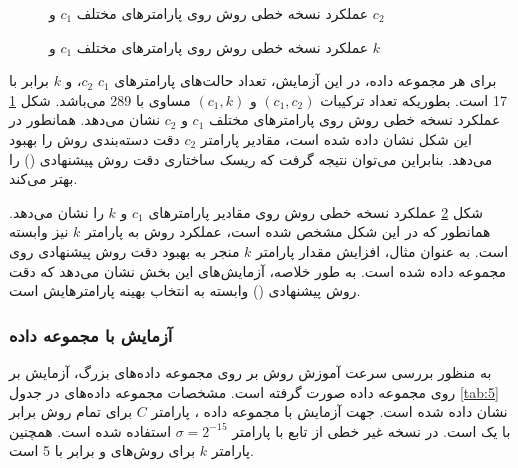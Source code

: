 \begin{figure}[!t]
	\centering
	\caption{عملکرد نسخه خطی روش  روی پارامترهای مختلف $c_{1}$ و $c_{2}$}
	\label{fig:RKNN-TSVM-Aust-Hep-C_1_2}
\end{figure}
\begin{figure}[!t]
	\centering
	\caption{عملکرد نسخه خطی روش  روی پارامترهای مختلف $c_{1}$ و $k$}
	\label{fig:RKNN-TSVM-Aust-Hep-C_1_k}
\end{figure}

برای هر مجموعه داده، در این آزمایش، تعداد حالت‌های پارامترهای $c_{1}$ $c_{2}$، و $k$ برابر با 17 است. بطوریکه تعداد ترکیبات $(c_{1},c_{2})$ و $(c_{1}, k)$ مساوی با 289 می‌باشد. شکل \ref{fig:RKNN-TSVM-Aust-Hep-C_1_2} عملکرد نسخه خطی روش روی پارامترهای مختلف $c_{1}$ و $c_{2}$ نشان می‌دهد. همانطور در این شکل نشان داده شده است، مقادیر پارامتر $c_{2}$ دقت دسته‌بندی روش  را بهبود می‌دهد. بنابراین می‌توان نتیجه گرفت که ریسک ساختاری دقت روش ‍پیشنهادی () را بهتر می‌کند.

شکل \ref{fig:RKNN-TSVM-Aust-Hep-C_1_k} عملکرد نسخه خطی روش  روی مقادیر پارامترهای $c_{1}$ و $k$ را نشان می‌دهد. همانطور که در این شکل مشخص شده است، عملکرد روش  به پارامتر $k$ نیز وابسته است. به عنوان مثال، افزایش مقدار پارامتر $k$ منجر به بهبود دقت روش پیشنهادی روی مجموعه داده  شده است. به طور خلاصه، آزمایش‌های این بخش نشان می‌دهد که دقت روش پیشنهادی () وابسته به انتخاب بهینه پارامترهایش است.

\subsubsection{آزمایش با مجموعه داده }\label{sec:5:3:3:5}
به منظور بررسی سرعت آموزش روش  بر روی مجموعه داده‌های بزرگ، آزمایش بر روی مجموعه داده  \cite{musicant1998} صورت گرفته است. مشخصات مجموعه داده‌های  در جدول \ref{tab:5} نشان داده شده است. جهت آزمایش با مجموعه داده ، پارامتر $C$ برای تمام روش برابر با یک است. در نسخه غیر خطی از تابع  با پارامتر $\sigma=2^{-15}$ استفاده شده است. همچنین پارامتر  $k$ برای روش‌های  و  برابر با 5 است. 

